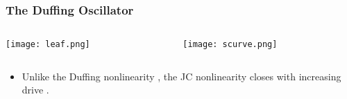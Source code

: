 \documentclass{beamer}
\begin{document}
\begin{frame}

    \frametitle{The Duffing Oscillator}

    \begin{columns}[c]

        \begin{column}{0.5\linewidth}
            \texttt{[image: leaf.png]}
        \end{column}

        \begin{column}{0.5\linewidth}
            \texttt{[image: scurve.png]}
        \end{column}

    \end{columns}
    \begin{block}{}
    \begin{itemize}

        \item Unlike the Duffing nonlinearity 
            ,
            the JC nonlinearity closes with increasing drive
            .

    \end{itemize}
\end{block}

\end{frame}
\begin{frame}

        

\end{frame}
\begin{frame}

    \printbibliography

\end{frame}
\end{document}
